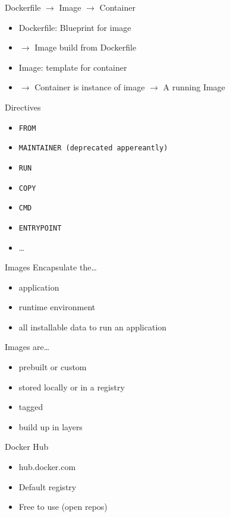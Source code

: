 \documentclass[aspectratio=169]{beamer}
\begin{document}
	\begin{frame}[allowframebreaks]{Dockerfile $\rightarrow$ Image $\rightarrow$ Container}
		\begin{itemize}
			\item Dockerfile: Blueprint for image
			\item[] $\rightarrow$ Image build from Dockerfile
			\item Image: template for container
			\item[] $\rightarrow$ Container is instance of image $\rightarrow$ A running Image
		\end{itemize}
		\framebreak
		Directives
		\begin{itemize}
			\item \texttt{FROM}
			\item \texttt{MAINTAINER (deprecated appereantly)}
			\item \texttt{RUN}
			\item \texttt{COPY}
			\item \texttt{CMD}
			\item \texttt{ENTRYPOINT}
			\item \dots
		\end{itemize}
	\end{frame}

	\begin{frame}{Images}
		Encapsulate the\dots
		\begin{itemize}
			\item application
			\item runtime environment
			\item all installable data to run an application
		\end{itemize}
		\framebreak
		Images are\dots
		\begin{itemize}
			\item prebuilt or custom
			\item stored locally or in a registry
			\item tagged
			\item build up in layers
		\end{itemize}
	\end{frame}

	\begin{frame}{Docker Hub}
		\begin{itemize}
			\item hub.docker.com
			\item Default registry
			\item Free to use (open repos)
		\end{itemize}
	\end{frame}
\end{document}
